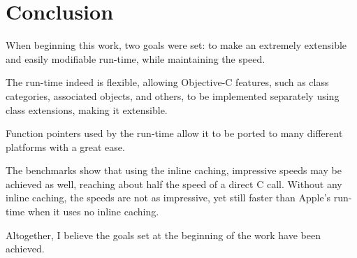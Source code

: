 \chapter*{Conclusion}

When beginning this work, two goals were set: to make an extremely extensible and easily modifiable run-time, while maintaining the speed.

The run-time indeed is flexible, allowing Objective-C features, such as class categories, associated objects, and others, to be implemented separately using class extensions, making it extensible.

Function pointers used by the run-time allow it to be ported to many different platforms with a great ease.

The benchmarks show that using the inline caching, impressive speeds may be achieved as well, reaching about half the speed of a direct C call. Without any inline caching, the speeds are not as impressive, yet still faster than Apple's run-time when it uses no inline caching.

Altogether, I believe the goals set at the beginning of the work have been achieved.
